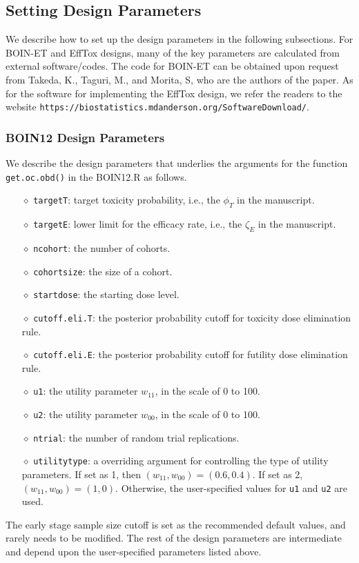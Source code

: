 \documentclass[notitlepage]{article}
\begin{document}
  \subsection{Setting Design Parameters}
  We describe how to set up the design parameters in the following subsections.
  For BOIN-ET and EffTox designs, many of the key parameters are calculated from external software/codes. The code for BOIN-ET can be obtained upon request from Takeda, K., Taguri, M., and Morita, S, who are the authors of the paper. As for the software for implementing the EffTox design, we refer the readers to the website \texttt{https://biostatistics.mdanderson.org/SoftwareDownload/}.

 \subsubsection{BOIN12 Design Parameters}
 We describe the design parameters that underlies the arguments for the function \texttt{get.oc.obd()} in the BOIN12.R as follows.
 \begin{itemize}
\item[$\diamond$] \texttt{targetT}: target toxicity probability, i.e., the $\phi_T$ in the manuscript.
\item[$\diamond$] \texttt{targetE}: lower limit for the efficacy rate, i.e., the $\zeta_E$ in the manuscript.
\item[$\diamond$] \texttt{ncohort}: the number of cohorts.
\item[$\diamond$] \texttt{cohortsize}: the size of a cohort.
\item[$\diamond$] \texttt{startdose}: the starting dose level.
\item[$\diamond$] \texttt{cutoff.eli.T}: the posterior probability cutoff for toxicity dose elimination rule.
\item[$\diamond$] \texttt{cutoff.eli.E}: the posterior probability cutoff for futility dose elimination rule.
\item[$\diamond$] \texttt{u1}: the utility parameter $w_{11}$, in the scale of 0 to 100.
\item[$\diamond$] \texttt{u2}: the utility parameter $w_{00}$, in the scale of 0 to 100.
\item[$\diamond$] \texttt{ntrial}: the number of random trial replications.
\item[$\diamond$] \texttt{utilitytype}: a overriding argument for controlling the type of utility parameters. If set as 1, then $(w_{11},w_{00}) = (0.6,0.4)$. If set as 2, $(w_{11},w_{00}) = (1,0)$. Otherwise, the user-specified values for \texttt{u1} and \texttt{u2} are used.
\end{itemize}
 The early stage sample size cutoff is set as the recommended default values, and rarely needs to be modified. The rest of the design parameters are intermediate and depend upon the user-specified parameters listed above.
\end{document}
